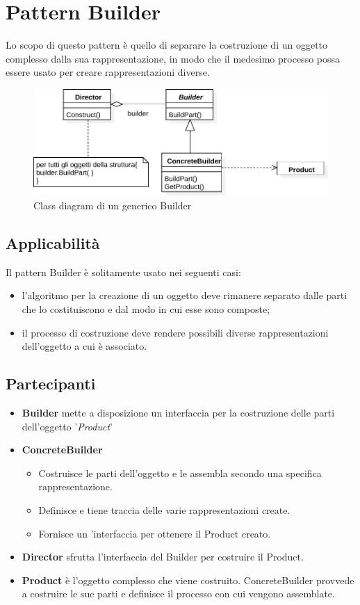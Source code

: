 \section{Pattern Builder}
\label{sec:builder}
Lo scopo di questo pattern è quello di separare la costruzione di un oggetto complesso dalla sua rappresentazione, in modo che il medesimo processo possa essere usato per creare rappresentazioni diverse.
\begin{figure}[htbp]
\centering
\includegraphics[width=\textwidth,height=\textheight,keepaspectratio]{images/builder-design-pattern.pdf}
\caption{Class diagram di un generico Builder}
\label{fig:builder-design-pattern}
\end{figure}
\subsection{Applicabilità}
Il pattern Builder è solitamente usato nei seguenti casi:
\begin{itemize}
\item l'algoritmo per la creazione di un oggetto deve rimanere separato dalle parti che lo costituiscono e dal modo in cui esse sono composte;
\item il processo di costruzione deve rendere possibili diverse rappresentazioni dell'oggetto a cui è associato.
\end{itemize}
\subsection{Partecipanti}
\begin{itemize}
\item \textbf{Builder} mette a disposizione un interfaccia per la costruzione delle parti dell'oggetto '\textit{Product}'
\item \textbf{ConcreteBuilder} 
	\begin{itemize}
	\item Costruisce le parti dell'oggetto e le assembla secondo una specifica rappresentazione.
	\item Definisce e tiene traccia delle varie rappresentazioni create.
	\item Fornisce un 'interfaccia per ottenere il Product creato.
	\end{itemize}
\item \textbf{Director} sfrutta l'interfaccia del Builder per costruire il Product.
\item \textbf{Product} è l'oggetto complesso che viene costruito. ConcreteBuilder provvede a costruire le sue parti e definisce il processo con cui vengono assemblate. 
\end{itemize}
